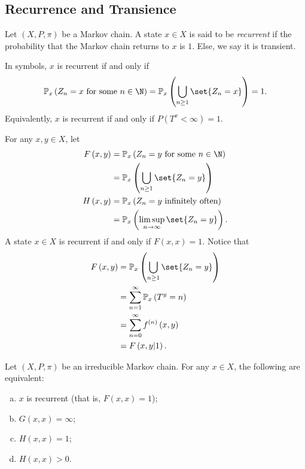 \documentclass[10pt]{mypackage}
\begin{document}
\subsection{Recurrence and Transience}%
\begin{definition}
  Let $\left( X,P,\pi \right)$ be a Markov chain. A state $x\in X$ is said to be \textit{recurrent} if the probability that the Markov chain returns to $x$ is $1$. Else, we say it is transient.

  In symbols, $ x $ is recurrent if and only if
  \begin{align*}
    \mathbb{P}_x\left( Z_n = x\text{ for some }n\in \N \right) = \mathbb{P}_x\left( \bigcup_{n\geq 1}\set{Z_n = x} \right) = 1.
  \end{align*}
  Equivalently, $x$ is recurrent if and only if $P\left( T^x < \infty \right) = 1$.
\end{definition}
For any $x,y\in X$, let
\begin{align*}
  F\left( x,y \right) &= \mathbb{P}_x\left( Z_n=y \text{ for some }n\in \N \right)\\
                      &= \mathbb{P}_x \left( \bigcup_{n\geq 1}\set{Z_n = y} \right)\\
  H\left( x,y \right) &= \mathbb{P}_x \left( Z_n=y\text{ infinitely often} \right)\\
                      &= \mathbb{P}_x\left( \limsup_{n\to\infty}\set{Z_n = y} \right).
\end{align*}
A state $x\in X$ is recurrent if and only if $F\left( x,x \right) = 1$. Notice that
\begin{align*}
  F\left( x,y \right) &= \mathbb{P}_x\left( \bigcup_{n\geq 1}\set{Z_n = y} \right)\\
                      &= \sum_{n=1}^{\infty} \mathbb{P}_x \left( T^y = n \right)\\
                      &= \sum_{n=0}^{\infty}f^{(n)}\left( x,y \right)\\
                      &= F\left( x,y|1 \right).
\end{align*}
\begin{theorem}
  Let $\left( X,P,\pi \right)$ be an irreducible Markov chain. For any $x\in X$, the following are equivalent:
  \begin{enumerate}[(a)]
    \item $x$ is recurrent (that is, $F\left( x,x \right) = 1$);
    \item $G\left( x,x \right) = \infty$;
    \item $H\left( x,x \right) = 1$;
    \item $H\left( x,x \right) > 0$.
  \end{enumerate}
\end{theorem}
\end{document}

